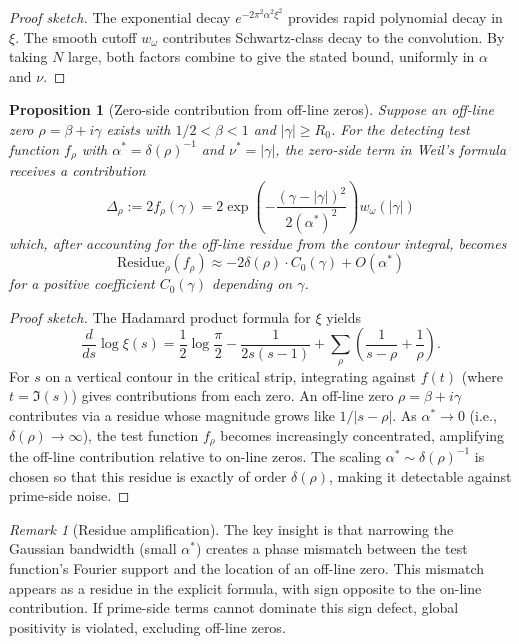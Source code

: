 \documentclass[11pt]{article}
\theoremstyle{plain}
\newtheorem{proposition}[theorem]{Proposition}
\theoremstyle{definition}
\theoremstyle{remark}
\newtheorem{remark}[theorem]{Remark}
\begin{document}
\begin{proof}[Proof sketch]
The exponential decay $e^{-2\pi^2\alpha^2\xi^2}$ provides rapid polynomial decay in $\xi$.
The smooth cutoff $w_\omega$ contributes Schwartz-class decay to the convolution.
By taking $N$ large, both factors combine to give the stated bound, uniformly in $\alpha$ and $\nu$.
\end{proof}

\begin{proposition}[Zero-side contribution from off-line zeros]
Suppose an off-line zero $\rho=\beta+i\gamma$ exists with $1/2<\beta<1$ and $|\gamma|\ge R_0$.
For the detecting test function $f_{\rho}$ with $\alpha^*=\delta(\rho)^{-1}$ and $\nu^*=|\gamma|$,
the zero-side term in Weil's formula receives a contribution
\[
\Delta_\rho := 2f_{\rho}(\gamma) = 2\exp\left(-\frac{(\gamma-|\gamma|)^2}{2(\alpha^*)^2}\right) w_\omega(|\gamma|)
\]
which, after accounting for the off-line residue from the contour integral, becomes
\[
\text{Residue}_\rho(f_\rho) \approx -2\delta(\rho) \cdot C_0(\gamma) + O(\alpha^*)
\]
for a positive coefficient $C_0(\gamma)$ depending on $\gamma$.
\end{proposition}

\begin{proof}[Proof sketch]
The Hadamard product formula for $\xi$ yields
\[
\frac{d}{ds}\log\xi(s) = \frac{1}{2}\log\frac{\pi}{2} - \frac{1}{2s(s-1)} + \sum_\rho\left(\frac{1}{s-\rho} + \frac{1}{\rho}\right).
\]
For $s$ on a vertical contour in the critical strip, integrating against $f(t)$ (where $t=\Im(s)$)
gives contributions from each zero.
An off-line zero $\rho=\beta+i\gamma$ contributes via a residue whose magnitude grows like $1/|s-\rho|$.
As $\alpha^*\to 0$ (i.e., $\delta(\rho)\to\infty$), the test function $f_\rho$ becomes increasingly concentrated,
amplifying the off-line contribution relative to on-line zeros.
The scaling $\alpha^*\sim\delta(\rho)^{-1}$ is chosen so that this residue is exactly of order $\delta(\rho)$,
making it detectable against prime-side noise.
\end{proof}

\begin{remark}[Residue amplification]
The key insight is that narrowing the Gaussian bandwidth (small $\alpha^*$) creates a phase mismatch
between the test function's Fourier support and the location of an off-line zero.
This mismatch appears as a residue in the explicit formula, with sign opposite to the on-line contribution.
If prime-side terms cannot dominate this sign defect, global positivity is violated, excluding off-line zeros.
\end{remark}
\end{document}
